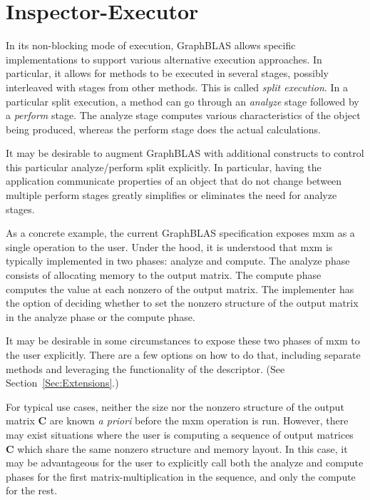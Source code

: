 \section{Inspector-Executor}

In its non-blocking mode of execution, GraphBLAS allows specific
implementations to support various alternative execution approaches. In
particular, it allows for methods to be executed in
several stages, possibly interleaved with stages from other methods. This
is called \emph{split execution}. In a particular split execution, a
method can go through an \emph{analyze} stage followed by a \emph{perform}
stage.  The analyze stage computes various characteristics of the object
being produced, whereas the perform stage does the actual calculations.

It may be desirable to augment GraphBLAS with additional constructs to
control this particular analyze/perform split explicitly. In particular,
having the application communicate properties of an object that do not
change between multiple perform stages greatly simplifies
or eliminates the need for analyze stages.

As a concrete example, the current GraphBLAS specification exposes {\sf
mxm} as a single operation to the user. Under the hood, it is understood
that {\sf mxm} is typically implemented in two phases: analyze and
compute. The analyze phase consists of allocating memory to the output
matrix. The compute phase computes the value at each nonzero of the
output matrix. The implementer has the option of deciding whether to
set the nonzero structure of the output matrix in the analyze phase or
the compute phase.

It may be desirable in some circumstances to expose these two phases of
{\sf mxm} to the user explicitly. There are a few options on how to do that, 
including separate methods and leveraging the functionality of the descriptor. 
(See Section~\ref{Sec:Extensions}.)

For typical use cases, neither the size nor the nonzero structure of the output
matrix \textbf{C} are known \emph{a priori} before the {\sf mxm}
operation is run. However, there may exist situations where the user is
computing a sequence of output matrices \textbf{C} which share
the same nonzero structure and memory layout. In this case, it may be advantageous for the user to 
explicitly call both the analyze and compute phases 
for the first matrix-multiplication
in the sequence, and only the compute for the rest.

